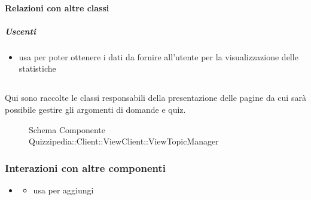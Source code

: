 \paragraph{Relazioni con altre classi}
\subparagraph{Uscenti}
\begin{itemize}
\item usa  per poter ottenere i dati da fornire all'utente per la visualizzazione delle statistiche
\end{itemize}
\subsection{}
Qui sono raccolte le classi responsabili della presentazione delle pagine da cui sarà possibile gestire gli argomenti di domande e quiz.
\begin{figure}[H]
\centering
\noindent{}
\caption[Schema Componente Quizzipedia::Client::ViewClient::ViewTopicManager]{Schema Componente Quizzipedia::Client::ViewClient::ViewTopicManager}
\end{figure}
\subsubsection{Interazioni con altre componenti}
\begin{itemize}
\item {}
\begin{itemize}
\item usa  per aggiungi
\end{itemize}
\end{itemize}
